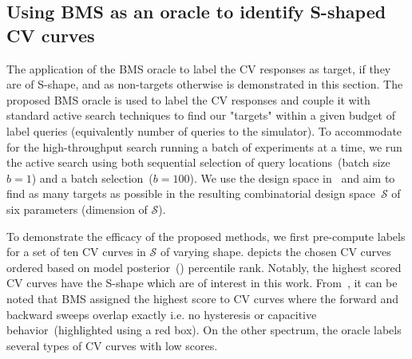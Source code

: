 \subsection{Using BMS as an oracle to identify S-shaped CV curves}
The application of the BMS oracle to label the CV responses as target, if they are of S-shape, and as non-targets otherwise is demonstrated in this section. 
The proposed BMS oracle is used to label the CV responses and couple it with standard active search techniques to find our "targets" within a given budget of label queries (equivalently number of queries to the simulator). 
To accommodate for the high-throughput search running a batch of experiments at a time, we run the active search using both sequential selection of query locations~(batch size \(b=1\)) and a batch selection~(\(b=100\)). 
We use the  design space in~ and aim to find as many targets as possible in the resulting combinatorial design space~\(\mathcal{S}\) of six parameters (dimension of \(\mathcal{S}\)). 

To demonstrate the efficacy of the proposed methods, we first pre-compute labels for a set of ten CV curves in \(\mathcal{S}\) of varying shape.
 depicts the chosen CV curves ordered based on model posterior~() percentile rank.
Notably, the highest scored CV curves have the S-shape which are of interest in this work.
From~, it can be noted that BMS assigned the highest score to CV curves where the forward and backward sweeps overlap exactly i.e. no hysteresis or capacitive behavior~(highlighted using a red box). 
On the other spectrum, the oracle labels several types of CV curves with low scores.  

